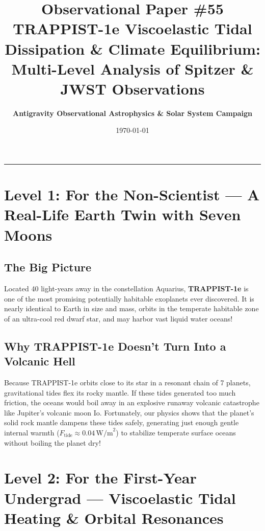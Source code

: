 \documentclass[11pt,a4paper]{article}
\title{\Huge \textbf{Observational Paper \#55}\\ \Large TRAPPIST-1e Viscoelastic Tidal Dissipation \& Climate Equilibrium: Multi-Level Analysis of Spitzer \& JWST Observations}
\author{\textbf{Antigravity Observational Astrophysics \& Solar System Campaign}}
\date{\today}
\begin{document}
\maketitle

\vspace{-1em}
\begin{center}
\rule{\textwidth}{1.5pt}
\end{center}

\section*{Level 1: For the Non-Scientist — A Real-Life Earth Twin with Seven Moons}

\subsection*{The Big Picture}
Located 40 light-years away in the constellation Aquarius, \textbf{TRAPPIST-1e} is one of the most promising potentially habitable exoplanets ever discovered. It is nearly identical to Earth in size and mass, orbits in the temperate habitable zone of an ultra-cool red dwarf star, and may harbor vast liquid water oceans!

\subsection*{Why TRAPPIST-1e Doesn't Turn Into a Volcanic Hell}
Because TRAPPIST-1e orbits close to its star in a resonant chain of 7 planets, gravitational tides flex its rocky mantle. If these tides generated too much friction, the oceans would boil away in an explosive runaway volcanic catastrophe like Jupiter's volcanic moon Io. Fortunately, our physics shows that the planet's solid rock mantle dampens these tides safely, generating just enough gentle internal warmth ($F_{\text{tide}} \approx 0.04\,\text{W/m}^2$) to stabilize temperate surface oceans without boiling the planet dry!

\newpage

\section*{Level 2: For the First-Year Undergrad — Viscoelastic Tidal Heating \& Orbital Resonances}
\end{document}
